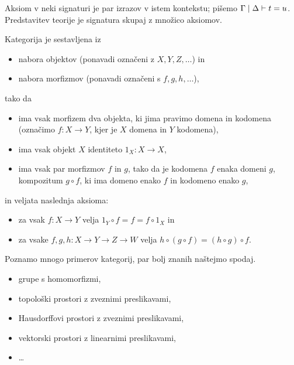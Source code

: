 \begin{definition}
    Aksiom v neki signaturi je par izrazov v istem kontekstu; pišemo \(\Gamma \mid \Delta \vdash t=u\).
    Predstavitev teorije je signatura skupaj z množico aksiomov.
\end{definition}

\begin{definition}
    Kategorija je sestavljena iz
    \begin{itemize}
        \item nabora objektov (ponavadi označeni z \(X,Y,Z,…\)) in
        \item nabora morfizmov (ponavadi označeni s \(f,g,h,…\)),
    \end{itemize}
    tako da
    \begin{itemize}
        \item ima vsak morfizem dva objekta, ki jima pravimo domena in kodomena (označimo \(f : X → Y\), kjer je \(X\) domena in \(Y\) kodomena),
        \item ima vsak objekt \(X\) identiteto \(1_X : X → X\),
        \item ima vsak par morfizmov \(f\) in \(g\), tako da je kodomena \(f\) enaka domeni \(g\), kompozitum \(g∘f\), ki ima domeno enako \(f\) in kodomeno enako \(g\),
    \end{itemize}
    in veljata naslednja aksioma:
    \begin{itemize}
        \item za vsak \(f : X → Y\) velja \(1_Y∘f = f = f∘1_X\) in
        \item za vsake \(f,g,h : X → Y → Z → W\) velja \(h∘(g∘f) = (h∘g)∘f\).
    \end{itemize}
\end{definition}

\begin{examples}
    Poznamo mnogo primerov kategorij, par bolj znanih naštejmo spodaj.
    \begin{itemize}
        \item grupe s homomorfizmi,
        \item topološki prostori z zveznimi preslikavami,
        \item Hausdorffovi prostori z zveznimi preslikavami,
        \item vektorski prostori z linearnimi preslikavami,
        \item …
    \end{itemize}
\end{examples}

